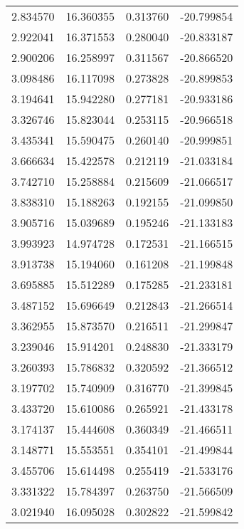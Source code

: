 \begin{tabular}{rrrr}
        2.834570 &        16.360355 &    0.313760 & -20.799854 \\
        2.922041 &        16.371553 &    0.280040 & -20.833187 \\
        2.900206 &        16.258997 &    0.311567 & -20.866520 \\
        3.098486 &        16.117098 &    0.273828 & -20.899853 \\
        3.194641 &        15.942280 &    0.277181 & -20.933186 \\
        3.326746 &        15.823044 &    0.253115 & -20.966518 \\
        3.435341 &        15.590475 &    0.260140 & -20.999851 \\
        3.666634 &        15.422578 &    0.212119 & -21.033184 \\
        3.742710 &        15.258884 &    0.215609 & -21.066517 \\
        3.838310 &        15.188263 &    0.192155 & -21.099850 \\
        3.905716 &        15.039689 &    0.195246 & -21.133183 \\
        3.993923 &        14.974728 &    0.172531 & -21.166515 \\
        3.913738 &        15.194060 &    0.161208 & -21.199848 \\
        3.695885 &        15.512289 &    0.175285 & -21.233181 \\
        3.487152 &        15.696649 &    0.212843 & -21.266514 \\
        3.362955 &        15.873570 &    0.216511 & -21.299847 \\
        3.239046 &        15.914201 &    0.248830 & -21.333179 \\
        3.260393 &        15.786832 &    0.320592 & -21.366512 \\
        3.197702 &        15.740909 &    0.316770 & -21.399845 \\
        3.433720 &        15.610086 &    0.265921 & -21.433178 \\
        3.174137 &        15.444608 &    0.360349 & -21.466511 \\
        3.148771 &        15.553551 &    0.354101 & -21.499844 \\
        3.455706 &        15.614498 &    0.255419 & -21.533176 \\
        3.331322 &        15.784397 &    0.263750 & -21.566509 \\
        3.021940 &        16.095028 &    0.302822 & -21.599842 \\

\end{tabular}
